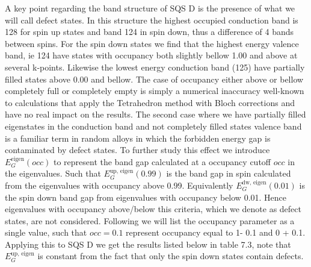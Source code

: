 A key point regarding the band structure of SQS D is the presence of what we will call defect states. In this structure the highest occupied conduction band is 128 for spin up states and band 124 in spin down, thus a difference of 4 bands between spins. For the spin down states we find that the highest energy valence band, ie 124 have states with occupancy both slightly bellow 1.00 and above at several k-points. Likewise the lowest energy conduction band (125) have partially filled states above 0.00 and bellow. The case of occupancy either above or bellow completely full or completely empty is simply a numerical inaccuracy well-known to calculations that apply the Tetrahedron method with Bloch corrections and have no real impact on the results. The second case where we have partially filled eigenstates in the conduction band and not completely filled states valence band is a familiar term in random alloys \cite{PhysRevLett.104.236403} in which the forbidden energy gap is contaminated by defect states. To further study this effect we introduce $E_G ^\text{eigen}(occ)$ to represent the band gap calculated at a occupancy cutoff $occ$ in the eigenvalues. Such that $E_G ^\text{up, eigen}(0.99)$ is the band gap in spin calculated from the eigenvalues with occupancy above 0.99. Equivalently $E_G ^\text{dw, eigen}(0.01)$ is the spin down band gap from eigenvalues with occupancy below 0.01. Hence eigenvalues with occupancy above/below this criteria, which we denote as defect states, are not considered. Following we will list the occupancy parameter as a single value, such that $occ = 0.1$ represent occupancy equal to 1- 0.1 and 0 + 0.1. Applying this to SQS D we get the results listed below in table 7.3, note that $E_G ^\text{up, eigen}$ is constant from the fact that only the spin down states contain defects.

